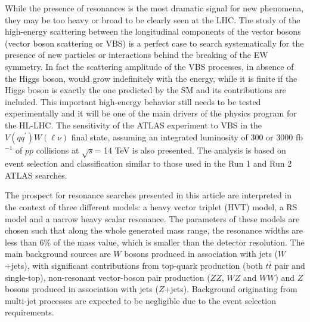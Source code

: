 While the presence of resonances is the most dramatic signal for new phenomena, they may be too heavy or broad to be clearly seen at the LHC. 
The study of the high-energy scattering between the longitudinal components of the vector bosons (vector boson scattering or VBS) is a 
perfect case to search systematically for the presence of new particles or interactions behind the breaking of the EW symmetry.  
In fact the scattering amplitude of the VBS processes, in absence of the Higgs boson, would grow indefinitely  with the \com energy, 
while it is finite if the Higgs boson is exactly the one predicted by the SM and its contributions are included. This important high-energy
behavior still needs to be tested experimentally and it will be one of the main drivers of the physics program for the HL-LHC. 
The sensitivity of the ATLAS experiment to VBS in the $\ensuremath{V(q q^{\prime})} \ensuremath{W(\ell\nu)}$ final state, assuming an integrated 
luminosity of 300 or 3000 fb$^{-1}$  of $pp$ collisions at $\sqrt{s}$= 14 TeV is also presented. 
The analysis is based on event selection and classification similar to those used in the Run 1 and Run 2 ATLAS 
searches. 


The prospect for resonance searches presented in this article are interpreted in the context of three different
models: a heavy vector triplet (HVT) model, a RS model and a narrow heavy scalar resonance.
The parameters of these models are chosen such that along the whole generated mass range, the resonance
widths are less than 6\% of the mass value, which is smaller than the detector resolution.
The main background sources are $W$ bosons produced in association with jets ($W$+jets), with significant contributions
from top-quark production (both  $t\bar{t}$ pair and single-top), non-resonant vector-boson pair production ($ZZ$,
$WZ$ and $WW$) and $Z$ bosons produced in association with jets ($Z$+jets). Background originating from
multi-jet processes are expected to be negligible due to the event selection requirements. 

